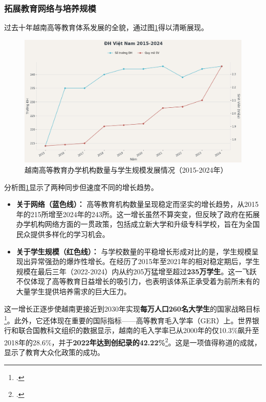 \subsubsection{拓展教育网络与培养规模}

过去十年越南高等教育体系发展的全貌，通过图\ref{fig:so_truong_quy_mo_sv}得以清晰展现。

\begin{figure}[h!]
    \centering
    \includegraphics[width=\textwidth]{image/dh_viet_nam_2015_2024.png}
    \caption{越南高等教育办学机构数量与学生规模发展情况（2015-2024年）}
    \label{fig:so_truong_quy_mo_sv}
\end{figure}

分析图\ref{fig:so_truong_quy_mo_sv}显示了两种同步但速度不同的增长趋势。
\begin{itemize}
    \item \textbf{关于网络（蓝色线）：} 高等教育机构数量呈现稳定而坚实的增长趋势，从2015年的215所增至2024年的243所。这一增长虽然不算突变，但反映了政府在拓展办学机构网络方面的一贯政策，包括成立新大学和升级专科学校，旨在为全国民众提供多样化的学习机会。
    \item \textbf{关于学生规模（红色线）：} 与学校数量的平稳增长形成对比的是，学生规模呈现出异常强劲的爆炸性增长。在经历了2015年至2021年的相对稳定期后，学生规模在最后三年（2022-2024）内从约205万猛增至超过\textbf{235万学生}。这一飞跃不仅体现了高等教育日益增长的吸引力，也表明该体系正承受着为前所未有的大量学生提供培养需求的巨大压力。
\end{itemize}

这一增长正逐步使越南更接近到2030年实现\textbf{每万人口260名大学生}的国家战略目标\footcite{sggp_en_3million_2030}。此外，它还体现在重要的国际指标——高等教育毛入学率（GER）上。世界银行和联合国教科文组织的数据显示，越南的毛入学率已从2000年的仅10.3\%飙升至2018年的28.6\%，并于\textbf{2022年达到创纪录的42.22\%}\footcite{worldbank_humancapital_2022}。这是一项值得称道的成就，显示了教育大众化政策的成功。

